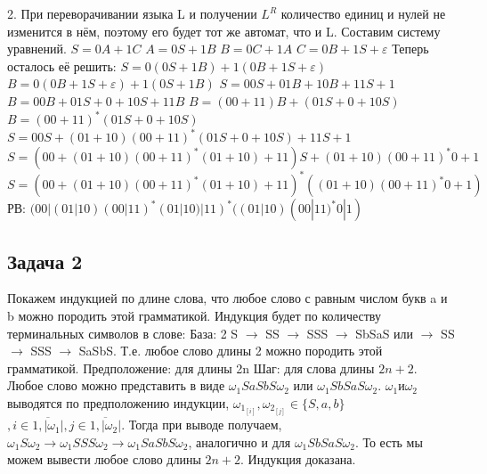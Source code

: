 \documentclass[a4paper,14pt]{article} %
\begin{document}
2. При переворачивании языка L и получении $L^R$ количество единиц и нулей не изменится в нём, поэтому его будет тот же автомат, что и L.
Составим систему уравнений.
$S = 0A + 1C$ \newline
$A = 0S + 1B$ \newline
$B = 0C + 1A$ \newline
$C = 0B + 1S + \varepsilon$ \newline
Теперь осталось её решить:
\newline
$S = 0(0S + 1B) + 1(0B + 1S + \varepsilon)$
\newline
$B = 0(0B + 1S + \varepsilon) + 1(0S + 1B)$
\newline
$S = 00S + 01B + 10B + 11S + 1$
\newline
$B = 00B + 01S + 0 + 10S + 11B$
\newline
$B = (00 + 11)B + (01S + 0 + 10S)$
\newline
$B = (00 + 11)^*(01S + 0 + 10S)$
\newline
$S = 00S + (01 + 10)(00 + 11)^*(01S + 0 + 10S) + 11S + 1$
\newline
$S = (00 + (01 + 10)(00 + 11)^*(01 + 10) + 11)S + (01 + 10)(00 + 11)^*0 + 1$
\newline
$S = (00 + (01 + 10)(00 + 11)^*(01 + 10) + 11)^*((01 + 10)(00 + 11)^*0 + 1)$
\newline
РВ: $(00|(01|10)(00|11)^*(01|10)|11)^*((01|10)(00|11)^*0|1)$

\subsection{Задача 2}
Покажем индукцией по длине слова, что любое слово с равным числом букв a и b можно породить этой грамматикой.
\newline
Индукция будет по количеству терминальных символов в слове:
\newline
База: 2 S $\longrightarrow$ SS $\longrightarrow$ SSS $\longrightarrow$ SbSaS или 
$\longrightarrow$ SS $\longrightarrow$ SSS $\longrightarrow$ SaSbS. Т.е. любое слово длины 2 можно породить этой грамматикой.
\newline
Предположение: для длины 2n 
\newline
Шаг: для слова длины $2n+2$. Любое слово можно представить в виде $\omega_1 S a S b S \omega_2$ или $\omega_1 S b S a S \omega_2$.
$\omega_1 \text{и} \omega_2$ выводятся по предположению индукции, $\omega_{1_{[i]}}, \omega_{2_{[j]}} \in \{S, a, b\}$ $, i \in \overline{1,|\omega_1|}, j \in \overline{1, |\omega_2|}$.
Тогда при выводе получаем, $\omega_1 S \omega_2 \longrightarrow \omega_1 SSS \omega_2 \longrightarrow \omega_1 SaSbS \omega_2$, аналогично и для $\omega_1 SbSaS \omega_2$.
То есть мы можем вывести любое слово длины $2n+2$. Индукция доказана.
\end{document}
